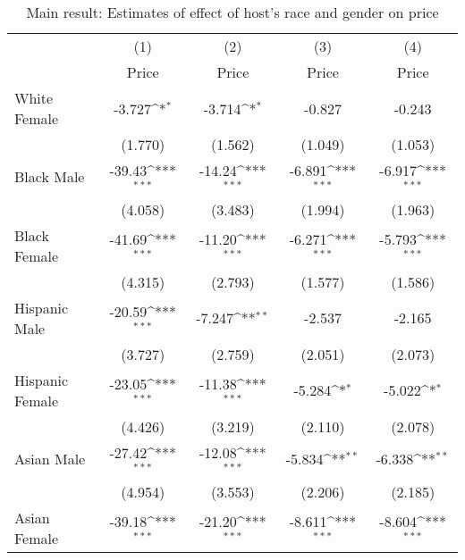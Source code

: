 {
\def\sym#1{\ifmmode^{#1}\else\(^{#1}\)\fi}
\begin{longtable}{l*{4}{c}}
\caption{Main result: Estimates of effect of host's race and gender on price}\\
\hline\hline\endfirsthead\hline\endhead\hline\endfoot\endlastfoot
                    &\multicolumn{1}{c}{(1)}&\multicolumn{1}{c}{(2)}&\multicolumn{1}{c}{(3)}&\multicolumn{1}{c}{(4)}\\
                    &\multicolumn{1}{c}{Price}&\multicolumn{1}{c}{Price}&\multicolumn{1}{c}{Price}&\multicolumn{1}{c}{Price}\\
\hline
White Female        &      -3.727\sym{*}  &      -3.714\sym{*}  &      -0.827         &      -0.243         \\
                    &     (1.770)         &     (1.562)         &     (1.049)         &     (1.053)         \\
[1em]
Black Male          &      -39.43\sym{***}&      -14.24\sym{***}&      -6.891\sym{***}&      -6.917\sym{***}\\
                    &     (4.058)         &     (3.483)         &     (1.994)         &     (1.963)         \\
[1em]
Black Female        &      -41.69\sym{***}&      -11.20\sym{***}&      -6.271\sym{***}&      -5.793\sym{***}\\
                    &     (4.315)         &     (2.793)         &     (1.577)         &     (1.586)         \\
[1em]
Hispanic Male       &      -20.59\sym{***}&      -7.247\sym{**} &      -2.537         &      -2.165         \\
                    &     (3.727)         &     (2.759)         &     (2.051)         &     (2.073)         \\
[1em]
Hispanic Female     &      -23.05\sym{***}&      -11.38\sym{***}&      -5.284\sym{*}  &      -5.022\sym{*}  \\
                    &     (4.426)         &     (3.219)         &     (2.110)         &     (2.078)         \\
[1em]
Asian Male          &      -27.42\sym{***}&      -12.08\sym{***}&      -5.834\sym{**} &      -6.338\sym{**} \\
                    &     (4.954)         &     (3.553)         &     (2.206)         &     (2.185)         \\
[1em]
Asian Female        &      -39.18\sym{***}&      -21.20\sym{***}&      -8.611\sym{***}&      -8.604\sym{***}\\

\end{longtable}}
